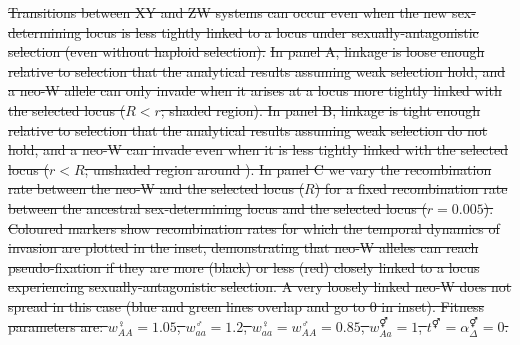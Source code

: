\documentclass[10pt,letterpaper]{article}
\providecommand{\DIFdeltex}[1]{{\protect\color{red}\sout{#1}}}                      %
\providecommand{\DIFdelFL}[1]{\DIFdel{#1}} %
\providecommand{\DIFdel}[1]{\texorpdfstring{\DIFdeltex{#1}}{}} %
\begin{document}
{%
\DIFdelFL{Transitions between XY and ZW systems can occur even when the new sex-determining locus is less tightly linked to a locus under sexually-antagonistic selection (even without haploid selection).}%
\DIFdelFL{In panel A, linkage is loose enough relative to selection that the analytical results assuming weak selection hold, and a neo-W allele can only invade when it arises at a locus more tightly linked with the selected locus ($R<r$; shaded region).
In panel B, linkage is tight enough relative to selection that the analytical results assuming weak selection do not hold, and a neo-W can invade even when it is less tightly linked with the selected locus ($r<R$; unshaded region around \text{*}).
In panel C we vary the recombination rate between the neo-W and the selected locus ($R$) for a fixed recombination rate between the ancestral sex-determining locus and the selected locus ($r=0.005$). 
Coloured markers show recombination rates for which the temporal dynamics of invasion are plotted in the inset, demonstrating that neo-W alleles can reach pseudo-fixation if they are more (black) or less (red) closely linked to a locus experiencing sexually-antagonistic selection. 
A very loosely linked neo-W does not spread in this case (blue and green lines overlap and go to 0 in inset). 
Fitness parameters are: $w_{AA}^\female = 1.05$, $w_{aa}^\male = 1.2$, $w_{aa}^\female = w_{AA}^\male = 0.85$, $w_{Aa}^\Hermaphrodite = 1$,  $t^\Hermaphrodite = \alpha^\Hermaphrodite_\Delta = 0$.
}}
\end{document}
